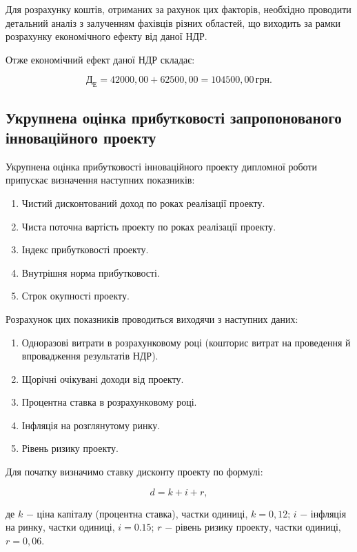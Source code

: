 Для розрахунку коштів, отриманих за рахунок цих факторів, необхідно проводити детальний аналіз з залученням фахівців різних областей, що виходить за рамки розрахунку економічного ефекту від даної НДР.

Отже економічний ефект даної НДР складає:

\[
	\text{Д}_{\text{Е}} = 42000,00 + 62500,00 = 104500,00 \, \text{грн}.
\]

\vspace{1.5em}

\subsection{Укрупнена оцінка прибутковості запропонованого інноваційного проекту}

Укрупнена оцінка прибутковості інноваційного проекту дипломної роботи припускає визначення наступних показників:

\begin{enumerate}
	\item Чистий дисконтований доход по роках реалізації проекту.
	\item Чиста поточна вартість проекту по роках реалізації проекту.
	\item Індекс прибутковості проекту.
	\item Внутрішня норма прибутковості.
	\item Строк окупності проекту.
\end{enumerate}

Розрахунок цих показників проводиться виходячи з наступних даних:

\begin{enumerate}
	\item Одноразові витрати в розрахунковому році (кошторис витрат на проведення й впровадження результатів НДР).
	\item Щорічні очікувані доходи від проекту.
	\item Процентна ставка в розрахунковому році.
	\item Інфляція на розглянутому ринку.
	\item Рівень ризику проекту.
\end{enumerate}

Для початку визначимо ставку дисконту проекту по формулі:

\begin{equation}\label{eq:economy12}
	d = k + i + r,
\end{equation}

\noindent де $k$ $-$ ціна капіталу (процентна ставка), частки одиниці, $k = 0,12$;
\hspace*{19pt}$i$ $-$ інфляція на ринку, частки одиниці, $i = 0.15$;
\hspace*{19pt}$r$ $-$ рівень ризику проекту, частки одиниці, $r = 0,06$.

